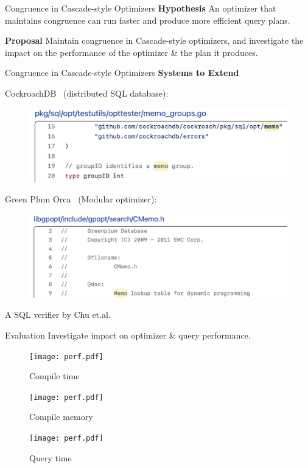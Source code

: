 \documentclass{beamer}
\begin{document}
  \begin{frame}{Congruence in Cascade-style Optimizers}
    \textbf{Hypothesis}
    An optimizer that maintains congruence can run faster and
    produce more efficient query plans.

    \textbf{Proposal}
    Maintain congruence in Cascade-style optimizers, and investigate
    the impact on the performance of the optimizer \& the 
    plan it produces.
  \end{frame}

  \begin{frame}{Congruence in Cascade-style Optimizers}
    \textbf{Systems to Extend}

    CockroachDB~\cite{cockroachdb} (distributed SQL database):
    \begin{figure}
      \includegraphics[width=0.6\linewidth]{cockroach.jpeg}
    \end{figure}
    Green Plum Orca~\cite{orca} (Modular optimizer):
    \begin{figure}
      \includegraphics[width=0.6\linewidth]{orca.jpeg}
    \end{figure}
    A SQL verifier by Chu et.al.~\cite{chu}
  \end{frame}

  \begin{frame}{Evaluation}
    Investigate impact on optimizer \& query performance.
    \begin{figure}
    \begin{minipage}{0.3\textwidth}
        \texttt{[image: perf.pdf]} %
        \caption*{Compile time}
    \end{minipage}
    \begin{minipage}{0.3\textwidth}
        \texttt{[image: perf.pdf]} %
        \caption*{Compile memory}
    \end{minipage}
    \begin{minipage}{0.3\textwidth}
      \texttt{[image: perf.pdf]} %
      \caption*{Query time}
    \end{minipage}
    \end{figure}
  \end{frame}
\end{document}
